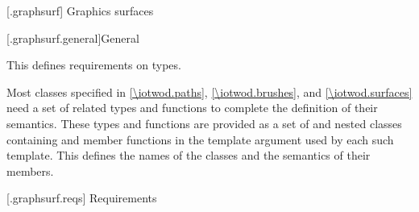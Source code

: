
 [\iotwod.graphsurf] {Graphics surfaces}

 [\iotwod.graphsurf.general]{General}

\pnum
This \clause{} defines requirements on \term{\graphicssurfacestemplparamnospace} types.

\pnum
Most classes specified in \ref{\iotwod.paths}, \ref{\iotwod.brushes}, and \ref{\iotwod.surfaces} need a set of related types and functions to complete the definition of their semantics. These types and functions are provided as a set of  and nested classes containing  and  member functions in the template argument \tcode{\graphicssurfacestemplparamnospace} used by each such template. This \clause{} defines the names of the classes and the semantics of their members.

 [\iotwod.graphsurf.reqs] {Requirements}








